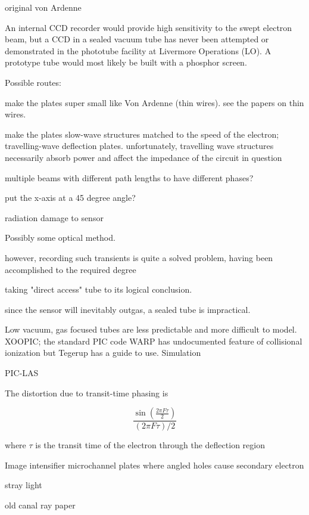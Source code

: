 \documentclass[paper.tex]{subfiles}
\begin{document}
original von Ardenne 


\begin{fquote}
An internal CCD recorder would provide high sensitivity to the swept electron beam, but a CCD in a sealed vacuum tube has never been attempted or demonstrated in the phototube facility at Livermore Operations (LO). A prototype tube would most likely be built with a phosphor screen.
\end{fquote}


Possible routes:

make the plates super small like Von Ardenne (thin wires). see the papers on thin wires.

make the plates slow-wave structures matched to the speed of the electron; travelling-wave deflection plates.
unfortunately, travelling wave structures necessarily absorb power and affect the impedance of the circuit in question


multiple beams with different path lengths to have different phases?

put the x-axis at a 45 degree angle?


radiation damage to sensor 

Possibly some optical method. 

however, recording such transients is quite a solved problem, having been accomplished to the required degree 

taking "direct access" tube to its logical conclusion.

since the sensor will inevitably outgas, a sealed tube is impractical.


Low vacuum, gas focused tubes are less predictable and more difficult to model. XOOPIC; the standard PIC code WARP has undocumented feature of collisional ionization but Tegerup has a guide to use. Simulation

PIC-LAS




The distortion due to transit-time phasing is

$$ \frac{\sin(\frac{2\pi F \tau}{2})}{(2\pi F \tau)/2} $$

where $\tau$ is the transit time of the electron through the deflection region 

Image intensifier microchannel plates where angled holes cause secondary electron 


stray light 

old canal ray paper
\end{document}
